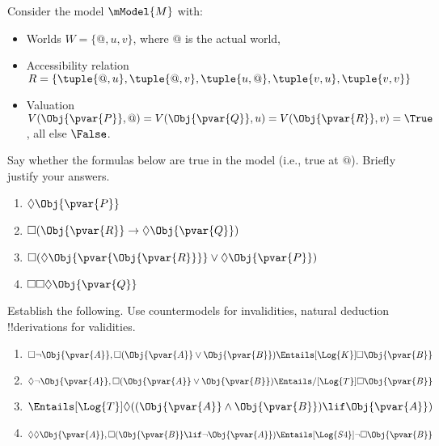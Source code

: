 \documentclass[../../../include/open-logic-section]{subfiles}
\begin{document}

\newpage
{}

\begin{prob}
 Consider the model $\mModel{M}$ with:
 \begin{itemize}
    \item Worlds $W=\{@,u,v\}$, where $@$ is the actual world,
    \item Accessibility relation 
    $R=\{\tuple{@,u},\tuple{@,v},\tuple{u,@},\tuple{v,u},\tuple{v,v}\}$
    \item Valuation $V(\Obj{\pvar{P}},@)=V(\Obj{\pvar{Q}},u)=V(\Obj{\pvar{R}},v)=\True$, all else $\False$.
 \end{itemize}
 Say whether the formulas below are true in the model (i.e., true at
    $@$). Briefly justify your answers.
    \begin{enumerate}
    \item $\Diamond \Obj{\pvar{P}}$
    \item $\Box(\Obj{\pvar{R}}\rightarrow\Diamond \Obj{\pvar{Q}})$
    \item $\Box(\Diamond \Obj{\pvar{\Obj{\pvar{R}}}}\lor\Diamond \Obj{\pvar{P}})$
    \item $\Box\Box\Diamond \Obj{\pvar{Q}}$
    \end{enumerate}
    
\end{prob}

\begin{prob}
    Establish the following. Use countermodels for invalidities, 
    natural deduction !!{derivation}s for validities. 
    \begin{enumerate}
        \item $\Box\lnot\Obj{\pvar{A}}, 
        \Box(\Obj{\pvar{A}}\lor\Obj{\pvar{B}})
        \Entails[\Log{K}] \Box{\Obj{\pvar{B}}}$

        \item $\Diamond\lnot\Obj{\pvar{A}}, 
        \Box(\Obj{\pvar{A}}\lor\Obj{\pvar{B}})
        \Entails/[\Log{T}] \Box{\Obj{\pvar{B}}}$

        \item $\Entails[\Log{T}]\Diamond(
            (\Obj{\pvar{A}}\land\Obj{\pvar{B}})\lif\Obj{\pvar{A}}
        )$

        \item $\Diamond\Diamond \Obj{\pvar{A}},
        \Box(\Obj{\pvar{B}}\lif\lnot\Obj{\pvar{A}})
        \Entails[\Log{S4}] \lnot\Box\Obj{\pvar{B}}$
    
    \end{enumerate}

\end{prob}
\end{document}
